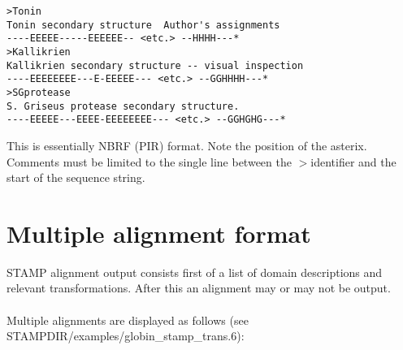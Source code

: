 \begin{scriptsize}\begin{verbatim}
>Tonin
Tonin secondary structure  Author's assignments
----EEEEE-----EEEEEE-- <etc.> --HHHH---*
>Kallikrien
Kallikrien secondary structure -- visual inspection
----EEEEEEEE---E-EEEEE--- <etc.> --GGHHHH---*
>SGprotease
S. Griseus protease secondary structure.
----EEEEE---EEEE-EEEEEEEE--- <etc.> --GGHGHG---*
\end{verbatim} \end{scriptsize}

This is essentially NBRF (PIR) format.  Note the position of the asterix.  
Comments must be limited to the single line between the $>$identifier and 
the start of the sequence string.

\section{Multiple alignment format}

STAMP alignment output consists first of a list of domain descriptions and 
relevant transformations.  After this an alignment may or may not
be output. \\
\\
Multiple alignments are displayed as follows (see 
STAMPDIR/examples/globin\_stamp\_trans.6):\\


